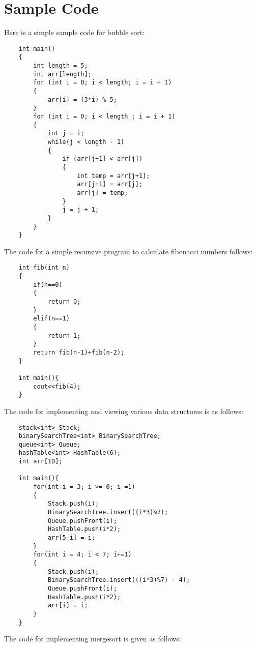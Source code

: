\documentclass[12pt]{article}
\begin{document}
\section{Sample Code}
Here is a simple sample code for bubble sort:
\begin{verbatim}
    int main()
    {
        int length = 5;
        int arr[length];
        for (int i = 0; i < length; i = i + 1)
        {
            arr[i] = (3*i) % 5;
        }
        for (int i = 0; i < length ; i = i + 1)
        {
            int j = i;
            while(j < length - 1)
            {
                if (arr[j+1] < arr[j])
                {
                    int temp = arr[j+1];
                    arr[j+1] = arr[j];
                    arr[j] = temp;
                }
                j = j + 1;
            }
        }
    }

\end{verbatim}
The code for a simple recursive program to calculate fibonacci numbers follows:
\begin{verbatim}
    int fib(int n)
    {
        if(n==0)
        {
            return 0;
        }
        elif(n==1)
        {
            return 1;
        }
        return fib(n-1)+fib(n-2);
    }
    
    int main(){
        cout<<fib(4);
    }
\end{verbatim}
The code for implementing and viewing various data structures is as follows:
\begin{verbatim}
    stack<int> Stack;
    binarySearchTree<int> BinarySearchTree;
    queue<int> Queue;
    hashTable<int> HashTable(6);
    int arr[10];
    
    int main(){
        for(int i = 3; i >= 0; i-=1)
        {
            Stack.push(i);
            BinarySearchTree.insert((i*3)%7);
            Queue.pushFront(i);
            HashTable.push(i*2);
            arr[5-i] = i; 
        }
        for(int i = 4; i < 7; i+=1)
        {
            Stack.push(i);
            BinarySearchTree.insert(((i*3)%7) - 4);
            Queue.pushFront(i);
            HashTable.push(i*2);
            arr[i] = i; 
        }
    }
\end{verbatim}
The code for implementing mergesort is given as follows:
\end{document}
